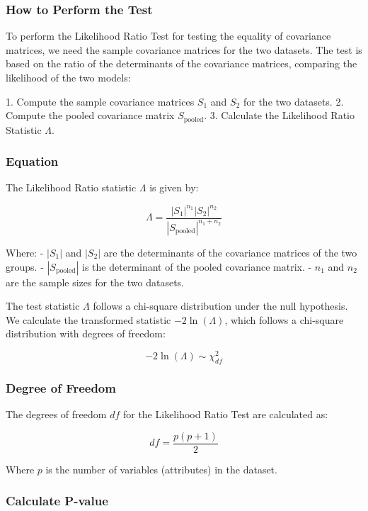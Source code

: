 \documentclass[11pt]{article}
\begin{document}
\subsubsection{How to Perform the Test}

To perform the Likelihood Ratio Test for testing the equality of covariance matrices, we need the sample covariance matrices for the two datasets. The test is based on the ratio of the determinants of the covariance matrices, comparing the likelihood of the two models:

1. Compute the sample covariance matrices \( S_1 \) and \( S_2 \) for the two datasets.
2. Compute the pooled covariance matrix \( S_{\text{pooled}} \).
3. Calculate the Likelihood Ratio Statistic \( \Lambda \).

\subsubsection{Equation}

The Likelihood Ratio statistic \( \Lambda \) is given by:

\[
\Lambda = \frac{\left| S_1 \right|^{n_1} \left| S_2 \right|^{n_2}}{\left| S_{\text{pooled}} \right|^{n_1 + n_2}}
\]

Where:
- \( |S_1| \) and \( |S_2| \) are the determinants of the covariance matrices of the two groups.
- \( |S_{\text{pooled}}| \) is the determinant of the pooled covariance matrix.
- \( n_1 \) and \( n_2 \) are the sample sizes for the two datasets.

The test statistic \( \Lambda \) follows a chi-square distribution under the null hypothesis. We calculate the transformed statistic \( -2 \ln(\Lambda) \), which follows a chi-square distribution with degrees of freedom:

\[
-2 \ln(\Lambda) \sim \chi^2_{df}
\]

\subsubsection{Degree of Freedom}

The degrees of freedom \( df \) for the Likelihood Ratio Test are calculated as:

\[
df = \frac{p(p + 1)}{2}
\]

Where \( p \) is the number of variables (attributes) in the dataset.

\subsubsection{Calculate P-value}
\end{document}
